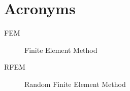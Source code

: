 
\chapter{Acronyms}
\begin{description}
\item[FEM] Finite Element Method
\item[RFEM] Random Finite Element Method

\end{description}
